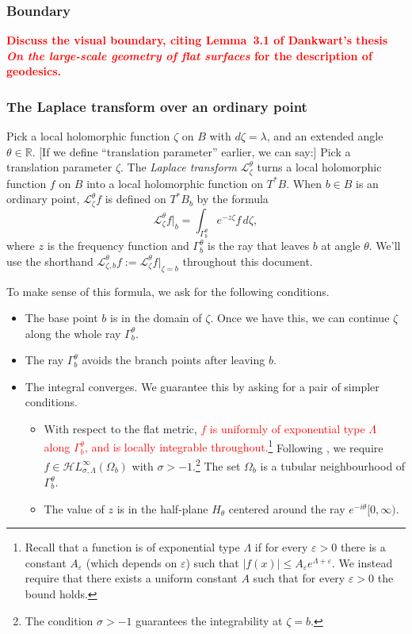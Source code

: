 \documentclass{article}
\newcommand{\singexp}[2]{\mathcal{H}L^\infty_{#1, #2}}
\theoremstyle{definition}
\newcommand{\R}{\mathbb{R}}
\newcommand{\laplace}{\mathcal{L}}
\theoremstyle{plain}
\begin{document}
\subsubsection{Boundary}
\textcolor{red}{\textbf{Discuss the visual boundary, citing Lemma~3.1 of Dankwart's thesis \textit{On the large-scale geometry of flat surfaces} for the description of geodesics.}}
%
\subsubsection{The Laplace transform over an ordinary point}\label{laplace:ordinary}
Pick a local holomorphic function $\zeta$ on $B$ with $d\zeta = \lambda$, and an extended angle $\theta \in \R$. \textcolor{VioletRed}{[If we define ``translation parameter'' earlier, we can say:] Pick a translation parameter $\zeta$.} The {\em Laplace transform} $\laplace_\zeta^\theta$ turns a local holomorphic function $f$ on $B$ into a local holomorphic function on $T^*B$. When $b \in B$ is an ordinary point, $\laplace_\zeta^\theta f$ is defined on $T^*B_b$ by the formula
\begin{equation}\label{laplace:int}
\laplace_\zeta^\theta f\big|_b = \int_{\Gamma_b^\theta} e^{-z\zeta} f\,d\zeta,
\end{equation}
where $z$ is the frequency function and $\Gamma_b^\theta$ is the ray that leaves $b$ at angle $\theta$. We’ll use the shorthand $\laplace_{\zeta, b}^\theta f := \laplace_\zeta^\theta f \big|_{\zeta = b}$ throughout this document.

To make sense of this formula, we ask for the following conditions.
\begin{itemize}
\item The base point $b$ is in the domain of $\zeta$. Once we have this, we can continue $\zeta$ along the whole ray $\Gamma_b^\theta$.
\item The ray $\Gamma_b^\theta$ avoids the branch points after leaving $b$.
\item The integral converges. We guarantee this by asking for a pair of simpler conditions.
\begin{itemize}
\item With respect to the flat metric, \textcolor{red}{$f$ is uniformly of exponential type $\Lambda$ along $\Gamma_b^\theta$, and is locally integrable throughout.}\footnote{Recall that a function is of exponential type $\Lambda$ if for every $\varepsilon>0$ there is a constant $A_\varepsilon$ (which depends on $\varepsilon$) such that $|f(x)|\leq A_\varepsilon e^{\Lambda+\varepsilon} $. We instead require that there exists a uniform constant $A$ such that for every $\varepsilon>0$ the bound holds.} Following \cite{reg-sing-volterra}, we require $f\in\singexp{\sigma}{\Lambda}(\Omega_b)$ with $\sigma>-1$.\footnote{The condition $\sigma>-1$ guarantees the integrability at $\zeta=b$.} The set $\Omega_b$ is a tubular neighbourhood of $\Gamma_b^\theta$. 
\item The value of $z$ is in the half-plane $H_{\theta}$ centered around the ray $e^{-i\theta} [0, \infty)$.
\end{itemize}
\end{itemize}
\color{black}
\end{document}
